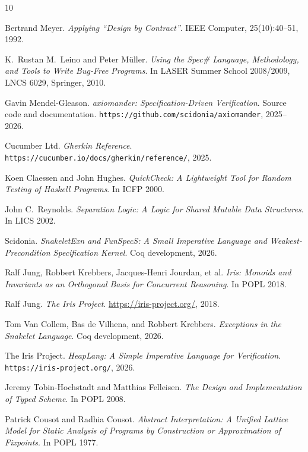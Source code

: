 \documentclass[11pt,a4paper]{article}
\begin{document}
\begin{thebibliography}{10}

Bertrand Meyer.
\textit{Applying ``Design by Contract''}.
IEEE Computer, 25(10):40--51, 1992.

K.\ Rustan M.\ Leino and Peter M\"uller.
\textit{Using the Spec\# Language, Methodology, and Tools to Write
Bug-Free Programs}.
In LASER Summer School 2008/2009, LNCS 6029, Springer, 2010.

Gavin Mendel-Gleason.
\textit{axiomander: Specification-Driven Verification}.
Source code and documentation. \texttt{https://github.com/scidonia/axiomander}, 2025--2026.

Cucumber Ltd.
\textit{Gherkin Reference}.
\texttt{https://cucumber.io/docs/gherkin/reference/}, 2025.

Koen Claessen and John Hughes.
\textit{QuickCheck: A Lightweight Tool for Random Testing of Haskell Programs}.
In ICFP 2000.

John C.\ Reynolds.
\textit{Separation Logic: A Logic for Shared Mutable Data Structures}.
In LICS 2002.

Scidonia.
\textit{SnakeletExn and FunSpecS: A Small Imperative Language and
Weakest-Precondition Specification Kernel}.
Coq development, 2026.

Ralf Jung, Robbert Krebbers, Jacques-Henri Jourdan, et al.
\textit{Iris: Monoids and Invariants as an Orthogonal Basis for
Concurrent Reasoning}.  In POPL 2018.

Ralf Jung.
\textit{The Iris Project}. \url{https://iris-project.org/}, 2018.

Tom Van Collem, Bas de Vilhena, and Robbert Krebbers.
\textit{Exceptions in the Snakelet Language}.
Coq development, 2026.

The Iris Project.
\textit{HeapLang: A Simple Imperative Language for Verification}.
\texttt{https://iris-project.org/}, 2026.

Jeremy Tobin-Hochstadt and Matthias Felleisen.
\textit{The Design and Implementation of Typed Scheme}.
In POPL 2008.

Patrick Cousot and Radhia Cousot.
\textit{Abstract Interpretation: A Unified Lattice Model for
Static Analysis of Programs by Construction or Approximation
of Fixpoints}.  In POPL 1977.


\end{thebibliography}
\end{document}
